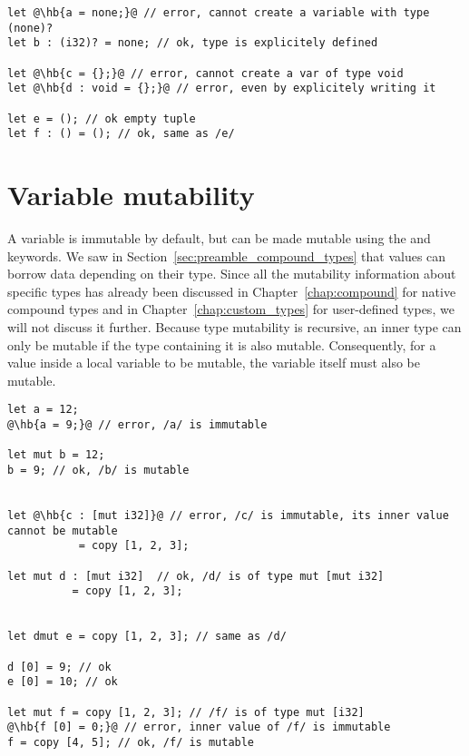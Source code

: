 \begin{lstlisting}[style=coloredverbatim, escapechar=@]
let @\hb{a = none;}@ // error, cannot create a variable with type (none)?
let b : (i32)? = none; // ok, type is explicitely defined

let @\hb{c = {};}@ // error, cannot create a var of type void
let @\hb{d : void = {};}@ // error, even by explicitely writing it

let e = (); // ok empty tuple
let f : () = (); // ok, same as /e/
\end{lstlisting}


\vfill%
\pagebreak

\section{Variable mutability}
\label{sec:variable_mutability}

A variable is immutable by default, but can be made mutable using the
 and  keywords. We saw in
Section~\ref{sec:preamble_compound_types} that values can borrow data depending
on their type. Since all the mutability information about specific types has
already been discussed in Chapter~\ref{chap:compound} for native compound types
and in Chapter~\ref{chap:custom_types} for user-defined types, we will not
discuss it further. Because type mutability is recursive, an inner type can only
be mutable if the type containing it is also mutable. Consequently, for a value
inside a local variable to be mutable, the variable itself must also be mutable.

\begin{lstlisting}[style=coloredverbatim, escapechar=@]
let a = 12;
@\hb{a = 9;}@ // error, /a/ is immutable

let mut b = 12;
b = 9; // ok, /b/ is mutable


let @\hb{c : [mut i32]}@ // error, /c/ is immutable, its inner value cannot be mutable
           = copy [1, 2, 3];

let mut d : [mut i32]  // ok, /d/ is of type mut [mut i32]
          = copy [1, 2, 3];


let dmut e = copy [1, 2, 3]; // same as /d/

d [0] = 9; // ok
e [0] = 10; // ok

let mut f = copy [1, 2, 3]; // /f/ is of type mut [i32]
@\hb{f [0] = 0;}@ // error, inner value of /f/ is immutable
f = copy [4, 5]; // ok, /f/ is mutable
\end{lstlisting}


